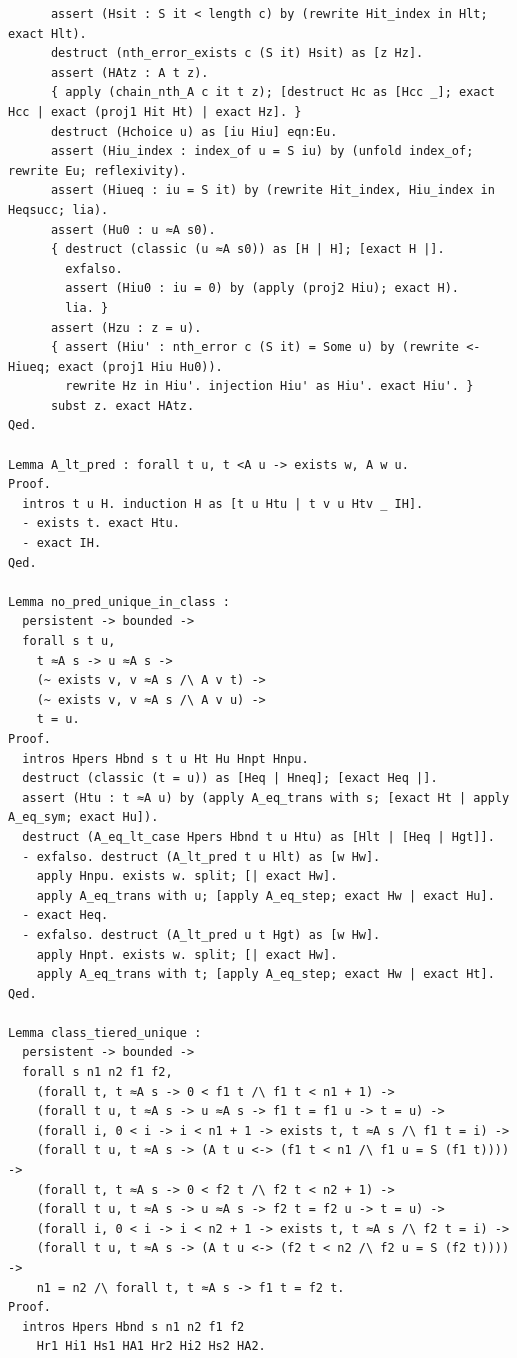 \begin{latin}
\begin{verbatim}
      assert (Hsit : S it < length c) by (rewrite Hit_index in Hlt; exact Hlt).
      destruct (nth_error_exists c (S it) Hsit) as [z Hz].
      assert (HAtz : A t z).
      { apply (chain_nth_A c it t z); [destruct Hc as [Hcc _]; exact Hcc | exact (proj1 Hit Ht) | exact Hz]. }
      destruct (Hchoice u) as [iu Hiu] eqn:Eu.
      assert (Hiu_index : index_of u = S iu) by (unfold index_of; rewrite Eu; reflexivity).
      assert (Hiueq : iu = S it) by (rewrite Hit_index, Hiu_index in Heqsucc; lia).
      assert (Hu0 : u ≈A s0).
      { destruct (classic (u ≈A s0)) as [H | H]; [exact H |].
        exfalso.
        assert (Hiu0 : iu = 0) by (apply (proj2 Hiu); exact H).
        lia. }
      assert (Hzu : z = u).
      { assert (Hiu' : nth_error c (S it) = Some u) by (rewrite <- Hiueq; exact (proj1 Hiu Hu0)).
        rewrite Hz in Hiu'. injection Hiu' as Hiu'. exact Hiu'. }
      subst z. exact HAtz.
Qed.

Lemma A_lt_pred : forall t u, t <A u -> exists w, A w u.
Proof.
  intros t u H. induction H as [t u Htu | t v u Htv _ IH].
  - exists t. exact Htu.
  - exact IH.
Qed.

Lemma no_pred_unique_in_class :
  persistent -> bounded ->
  forall s t u,
    t ≈A s -> u ≈A s ->
    (~ exists v, v ≈A s /\ A v t) ->
    (~ exists v, v ≈A s /\ A v u) ->
    t = u.
Proof.
  intros Hpers Hbnd s t u Ht Hu Hnpt Hnpu.
  destruct (classic (t = u)) as [Heq | Hneq]; [exact Heq |].
  assert (Htu : t ≈A u) by (apply A_eq_trans with s; [exact Ht | apply A_eq_sym; exact Hu]).
  destruct (A_eq_lt_case Hpers Hbnd t u Htu) as [Hlt | [Heq | Hgt]].
  - exfalso. destruct (A_lt_pred t u Hlt) as [w Hw].
    apply Hnpu. exists w. split; [| exact Hw].
    apply A_eq_trans with u; [apply A_eq_step; exact Hw | exact Hu].
  - exact Heq.
  - exfalso. destruct (A_lt_pred u t Hgt) as [w Hw].
    apply Hnpt. exists w. split; [| exact Hw].
    apply A_eq_trans with t; [apply A_eq_step; exact Hw | exact Ht].
Qed.

Lemma class_tiered_unique :
  persistent -> bounded ->
  forall s n1 n2 f1 f2,
    (forall t, t ≈A s -> 0 < f1 t /\ f1 t < n1 + 1) ->
    (forall t u, t ≈A s -> u ≈A s -> f1 t = f1 u -> t = u) ->
    (forall i, 0 < i -> i < n1 + 1 -> exists t, t ≈A s /\ f1 t = i) ->
    (forall t u, t ≈A s -> (A t u <-> (f1 t < n1 /\ f1 u = S (f1 t)))) ->
    (forall t, t ≈A s -> 0 < f2 t /\ f2 t < n2 + 1) ->
    (forall t u, t ≈A s -> u ≈A s -> f2 t = f2 u -> t = u) ->
    (forall i, 0 < i -> i < n2 + 1 -> exists t, t ≈A s /\ f2 t = i) ->
    (forall t u, t ≈A s -> (A t u <-> (f2 t < n2 /\ f2 u = S (f2 t)))) ->
    n1 = n2 /\ forall t, t ≈A s -> f1 t = f2 t.
Proof.
  intros Hpers Hbnd s n1 n2 f1 f2
    Hr1 Hi1 Hs1 HA1 Hr2 Hi2 Hs2 HA2.


\end{verbatim}
\end{latin}

